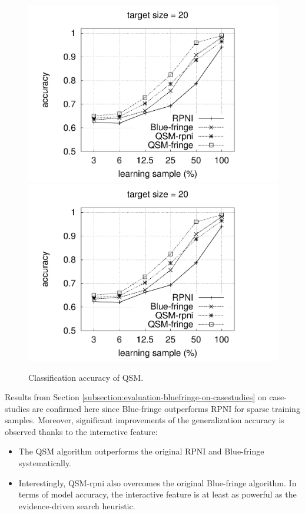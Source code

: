 \begin{figure}[t]
{  \includegraphics[trim=0mm  0mm 45mm 0mm, clip, page=3]{src/5-evaluation/images/accuracy}
  \includegraphics[trim=30mm 0mm 35mm 0mm, clip, page=4]{src/5-evaluation/images/accuracy}
}
\caption{Classification accuracy of QSM\label{image:evaluation-qsm-accuracy}.}
\end{figure}

Results from Section \ref{subsection:evaluation-bluefringe-on-casestudies} on case-studies are confirmed here since Blue-fringe outperforms RPNI for sparse training samples. Moreover, significant improvements of the generalization accuracy is observed thanks to the interactive feature:
\begin{itemize}
\item The QSM algorithm outperforms the original RPNI and Blue-fringe systematically. 
\item Interestingly, QSM-rpni also overcomes the original Blue-fringe algorithm. In terms of model accuracy, the interactive feature is at least as powerful as the evidence-driven search heuristic.
\end{itemize}

